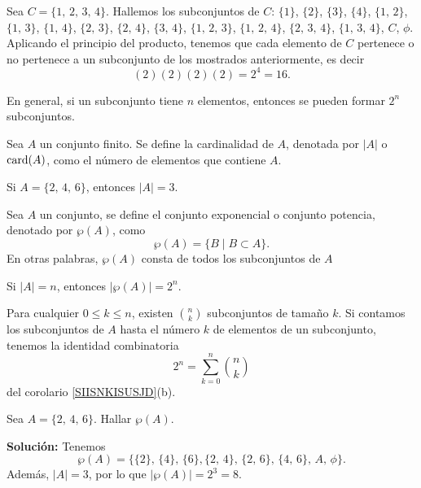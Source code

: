 \newpage

\begin{myexample}
    Sea $C = \{1, \, 2, \, 3, \, 4 \}$. Hallemos los subconjuntos de $C$: $\{ 1 \}$, $\{ 2 \}$, $\{ 3 \}$, $\{ 4 \}$, $\{ 1, \, 2 \}$, $\{ 1, \, 3 \}$, $\{ 1, \, 4 \}$, $\{ 2, \, 3 \}$, $\{ 2, \, 4 \}$, $\{ 3, \, 4 \}$, $\{1, \, 2, \, 3 \}$, $\{ 1, \, 2, \, 4 \}$, $\{ 2, \, 3, \, 4 \}$, $\{ 1, \, 3, \, 4 \}$, $C$, $\phi$. Aplicando el principio del producto, tenemos que cada elemento de $C$ pertenece o no pertenece a un subconjunto de los mostrados anteriormente, es decir
    $$(2)(2)(2)(2) = 2^4 = 16.$$
\end{myexample}

\begin{BOX}
    En general, si un subconjunto tiene $n$ elementos, entonces se pueden formar $2^n$ subconjuntos.
\end{BOX}

\begin{definicion}{}{}
    Sea $A$ un conjunto finito. Se define la cardinalidad de $A$, denotada por $|A|$ o $\operatorname{card} (A)$, como el número de elementos que contiene $A$.
\end{definicion}

\begin{myexample}
    Si $A = \{ 2, \, 4, \, 6 \}$, entonces $|A| = 3$.
\end{myexample}

\begin{definicion}{}{}
    Sea $A$ un conjunto, se define el conjunto exponencial o conjunto potencia, denotado por $\wp (A)$, como
    $$\wp(A) = \{B \mid B \subset A\}.$$
    En otras palabras, $\wp (A)$ consta de todos los subconjuntos de $A$
\end{definicion}

\begin{myexample}
    Si $|A| = n$, entonces $|\wp (A)| = 2^n$.
\end{myexample}

\begin{BOX}
    Para cualquier $0 \leq k \leq n$, existen $\displaystyle \binom{n}{k}$ subconjuntos de tamaño $k$. Si contamos los subconjuntos de $A$ hasta el número $k$ de elementos de un subconjunto, tenemos la identidad combinatoria
    $$2^n = \sum_{k=0}^{n} \binom{n}{k}$$
    del corolario \ref{SIISNKISUSJD}(b).
\end{BOX}

\begin{myexample}
    Sea $A = \{ 2, \, 4, \, 6 \}$. Hallar $\wp(A)$.

    \tcblower
    \textbf{\color{jblueleft}Solución:} Tenemos
    $$\wp(A) = \big\{ \{ 2 \}, \, \{ 4 \}, \, \{ 6 \}, \{2, \, 4 \}, \, \{ 2, \, 6 \}, \, \{ 4, \, 6 \}, \, A, \, \phi \big\}.$$
    Además, $|A| = 3$, por lo que $|\wp(A)| = 2^3 = 8$.
\end{myexample}

